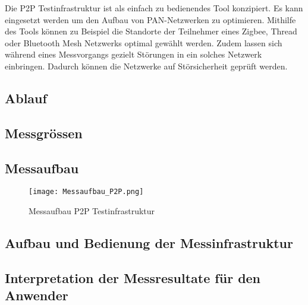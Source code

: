 Die P2P Testinfrastruktur ist als einfach zu bedienendes Tool konzipiert. Es kann eingesetzt werden um den Aufbau von PAN-Netzwerken zu optimieren. Mithilfe des Tools können zu Beispiel die Standorte der Teilnehmer eines Zigbee, Thread oder Bluetooth Mesh Netzwerks optimal gewählt werden. Zudem lassen sich während eines Messvorgangs gezielt Störungen in ein solches Netzwerk einbringen. Dadurch können die Netzwerke auf Störsicherheit geprüft werden. 


\subsection{Ablauf}\label{sec:AblaufP2P}

\subsection{Messgrössen}\label{sec:MessgrössenP2P}

\subsection{Messaufbau}\label{sec:Messaufbau}

\begin{figure} [H]
	\centering
	\texttt{[image: Messaufbau\_P2P.png]}
	\caption{Messaufbau P2P Testinfrastruktur}
	\label{fig:MessaufbauP2P}
\end{figure}


\subsection{Aufbau und Bedienung der Messinfrastruktur}\label{sec:AufbauundBedienungderMessinfrastruktur}

\subsection{Interpretation der Messresultate für den Anwender}\label{sec:InterpretationderMessresultatefürdenAnwender}

